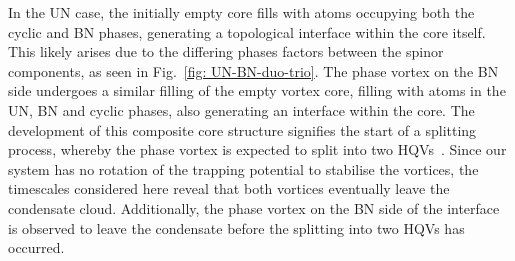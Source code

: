 In the UN case, the initially empty core fills with atoms occupying both the
cyclic and BN phases, generating a topological interface within the core itself.
This likely arises due to the differing phases factors between the spinor
components, as seen in Fig.~\ref{fig: UN-BN-duo-trio}.
The phase vortex on the BN side undergoes a similar filling of the empty vortex
core, filling with atoms in the UN, BN and cyclic phases, also generating an
interface within the core.
The development of this composite core structure signifies the start of a
splitting process, whereby the phase vortex is expected to split into two
HQVs~\cite{Seo2015, Xiao2021}.
Since our system has no rotation of the trapping potential to stabilise the
vortices, the timescales considered here reveal that both vortices eventually
leave the condensate cloud.
Additionally, the phase vortex on the BN side of the interface is observed to
leave the condensate before the splitting into two HQVs has occurred.

